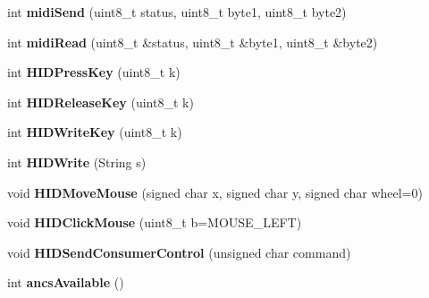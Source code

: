 \begin{DoxyCompactItemize}
\item 
\hypertarget{class_bean_class_af24a036ef59dbe9fce1e60e1d5ec3499}{}int {\bfseries midi\+Send} (uint8\+\_\+t status, uint8\+\_\+t byte1, uint8\+\_\+t byte2)\label{class_bean_class_af24a036ef59dbe9fce1e60e1d5ec3499}

\item 
\hypertarget{class_bean_class_ae113e3bb6bdfb0f3340022601e291fa7}{}int {\bfseries midi\+Read} (uint8\+\_\+t \&status, uint8\+\_\+t \&byte1, uint8\+\_\+t \&byte2)\label{class_bean_class_ae113e3bb6bdfb0f3340022601e291fa7}

\item 
\hypertarget{class_bean_class_a04048f5ae45f23460e9820812e08f70c}{}int {\bfseries H\+I\+D\+Press\+Key} (uint8\+\_\+t k)\label{class_bean_class_a04048f5ae45f23460e9820812e08f70c}

\item 
\hypertarget{class_bean_class_a6c1a4ca3eae1fb8f9dbe1a10d82fd911}{}int {\bfseries H\+I\+D\+Release\+Key} (uint8\+\_\+t k)\label{class_bean_class_a6c1a4ca3eae1fb8f9dbe1a10d82fd911}

\item 
\hypertarget{class_bean_class_aaca083b05f63d4b353e3e56547f5a07f}{}int {\bfseries H\+I\+D\+Write\+Key} (uint8\+\_\+t k)\label{class_bean_class_aaca083b05f63d4b353e3e56547f5a07f}

\item 
\hypertarget{class_bean_class_a9dac2136d8e0c8f0d9280f572679dadc}{}int {\bfseries H\+I\+D\+Write} (String s)\label{class_bean_class_a9dac2136d8e0c8f0d9280f572679dadc}

\item 
\hypertarget{class_bean_class_a026f6f7f28dfd3f7f7337b45aef5a463}{}void {\bfseries H\+I\+D\+Move\+Mouse} (signed char x, signed char y, signed char wheel=0)\label{class_bean_class_a026f6f7f28dfd3f7f7337b45aef5a463}

\item 
\hypertarget{class_bean_class_a79832f54ad950490ec3beacff81daeaa}{}void {\bfseries H\+I\+D\+Click\+Mouse} (uint8\+\_\+t b=M\+O\+U\+S\+E\+\_\+\+L\+E\+F\+T)\label{class_bean_class_a79832f54ad950490ec3beacff81daeaa}

\item 
\hypertarget{class_bean_class_ac1506cc650a8b6d18e18bd166afa7e2b}{}void {\bfseries H\+I\+D\+Send\+Consumer\+Control} (unsigned char command)\label{class_bean_class_ac1506cc650a8b6d18e18bd166afa7e2b}

\item 
\hypertarget{class_bean_class_acc43b64a48c140bae76ae947a6841d0a}{}int {\bfseries ancs\+Available} ()\label{class_bean_class_acc43b64a48c140bae76ae947a6841d0a}


\end{DoxyCompactItemize}
